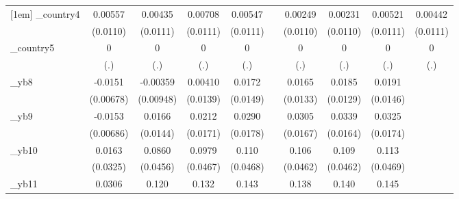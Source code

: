 \begin{table}[htbp]
\begin{tabular}{l*{9}{c}}
[1em]
\_country4   &     0.00557         &     0.00435         &     0.00708         &     0.00547         &                     &     0.00249         &     0.00231         &     0.00521         &     0.00442         \\
            &    (0.0110)         &    (0.0111)         &    (0.0111)         &    (0.0111)         &                     &    (0.0110)         &    (0.0110)         &    (0.0111)         &    (0.0111)         \\
[1em]
\_country5   &           0         &           0         &           0         &           0         &                     &           0         &           0         &           0         &           0         \\
            &         (.)         &         (.)         &         (.)         &         (.)         &                     &         (.)         &         (.)         &         (.)         &         (.)         \\
[1em]
\_yb8        &     -0.0151\sym{**} &    -0.00359         &     0.00410         &      0.0172         &                     &      0.0165         &      0.0185         &      0.0191         &                     \\
            &   (0.00678)         &   (0.00948)         &    (0.0139)         &    (0.0149)         &                     &    (0.0133)         &    (0.0129)         &    (0.0146)         &                     \\
[1em]
\_yb9        &     -0.0153\sym{**} &      0.0166         &      0.0212         &      0.0290         &                     &      0.0305\sym{*}  &      0.0339\sym{**} &      0.0325\sym{*}  &                     \\
            &   (0.00686)         &    (0.0144)         &    (0.0171)         &    (0.0178)         &                     &    (0.0167)         &    (0.0164)         &    (0.0174)         &                     \\
[1em]
\_yb10       &      0.0163         &      0.0860\sym{*}  &      0.0979\sym{**} &       0.110\sym{**} &                     &       0.106\sym{**} &       0.109\sym{**} &       0.113\sym{**} &                     \\
            &    (0.0325)         &    (0.0456)         &    (0.0467)         &    (0.0468)         &                     &    (0.0462)         &    (0.0462)         &    (0.0469)         &                     \\
[1em]
\_yb11       &      0.0306         &       0.120\sym{**} &       0.132\sym{**} &       0.143\sym{**} &                     &       0.138\sym{**} &       0.140\sym{**} &       0.145\sym{**} &                     \\

\end{tabular}
\end{table}
